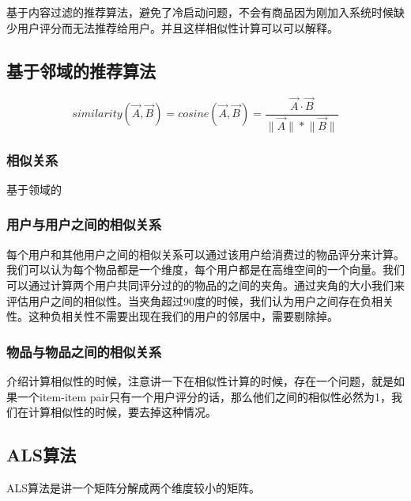 基于内容过滤的推荐算法，避免了冷启动问题，不会有商品因为刚加入系统时候缺少用户评分而无法推荐给用户。并且这样相似性计算可以可以解释。

\subsection{基于邻域的推荐算法}
    \begin{equation}
       similarity(\vec{A}, \vec{B}) = cosine(\vec{A}, \vec{B}) = \frac{\vec{A} \cdot \vec{B}}{\lVert\vec{A}\rVert\ast\lVert\vec{B}\rVert}
    \end{equation}

\subsubsection{相似关系}
基于领域的

\subsubsection{用户与用户之间的相似关系}
每个用户和其他用户之间的相似关系可以通过该用户给消费过的物品评分来计算。我们可以认为每个物品都是一个维度，每个用户都是在高维空间的一个向量。我们可以通过计算两个用户共同评分过的的物品的之间的夹角。通过夹角的大小我们来评估用户之间的相似性。当夹角超过90度的时候，我们认为用户之间存在负相关性。这种负相关性不需要出现在我们的用户的邻居中，需要剔除掉。
\subsubsection{物品与物品之间的相似关系}
介绍计算相似性的时候，注意讲一下在相似性计算的时候，存在一个问题，就是如果一个item-item pair只有一个用户评分的话，那么他们之间的相似性必然为1，我们在计算相似性的时候，要去掉这种情况。
\subsection{ALS算法}
ALS算法是讲一个矩阵分解成两个维度较小的矩阵。